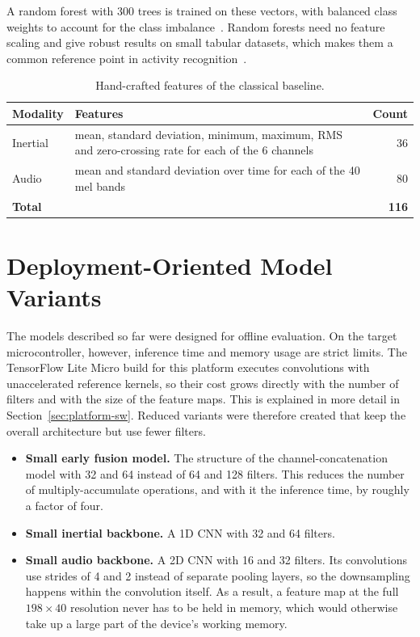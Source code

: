 A random forest with 300 trees is trained on these vectors, with balanced class
weights to account for the class imbalance~\cite{breiman2001random, pedregosa2011scikit}. Random forests need no feature scaling and give robust results on small
tabular datasets, which makes them a common reference point in activity
recognition~\cite{chatterjee2020laso, koch2024recognition}.

\begin{table}[htbp]
\centering
\small
\renewcommand{\arraystretch}{1.2}
\begin{tabularx}{\textwidth}{|l|X|r|}
\hline
\textbf{Modality} & \textbf{Features} & \textbf{Count} \\
\hline
Inertial & mean, standard deviation, minimum, maximum, RMS and zero-crossing rate for each of the 6 channels & 36 \\
Audio & mean and standard deviation over time for each of the 40 mel bands & 80 \\
\hline
\multicolumn{2}{|l|}{\textbf{Total}} & \textbf{116} \\
\hline
\end{tabularx}
\caption{Hand-crafted features of the classical baseline.}
\label{tab:features}
\end{table}

\section{Deployment-Oriented Model Variants}
\label{sec:small-models}

The models described so far were designed for offline evaluation. On the target
microcontroller, however, inference time and memory usage are strict limits.
The TensorFlow Lite Micro build for this platform executes convolutions with
unaccelerated reference kernels, so their cost grows directly with the number of
filters and with the size of the feature maps. This is explained in more detail in
Section~\ref{sec:platform-sw}. Reduced variants were therefore created that
keep the overall architecture but use fewer filters.

\begin{itemize}
  \item \textbf{Small early fusion model.} The structure of the
  channel-concatenation model with 32 and 64 instead of 64 and 128 filters. This
  reduces the number of multiply-accumulate operations, and with it the inference
  time, by roughly a factor of four.
  \item \textbf{Small inertial backbone.} A 1D CNN with 32 and 64 filters.
  \item \textbf{Small audio backbone.} A 2D CNN with 16 and 32 filters. Its
  convolutions use strides of 4 and 2 instead of separate pooling layers, so the
  downsampling happens within the convolution itself. As a result, a feature map
  at the full $198 \times 40$ resolution never has to be held in memory, which
  would otherwise take up a large part of the device's working memory.
\end{itemize}

